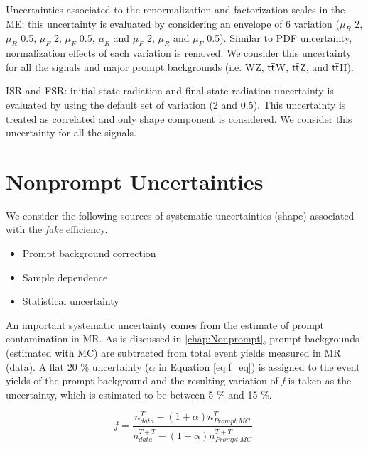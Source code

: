 Uncertainties associated to the renormalization and factorization scales in the \ac{ME}: this uncertainty is evaluated by considering an envelope of 6 variation ($\mu_R$ 2, $\mu_R$ 0.5, $\mu_F$ 2, $\mu_F$ 0.5, $\mu_R$ and $\mu_F$ 2, $\mu_R$ and $\mu_F$ 0.5). Similar to PDF uncertainty, normalization effects of each variation is removed. We consider this uncertainty for all the signals and major prompt backgrounds (i.e. WZ, $\textsf{t}\overline{\textsf{t}}$W, $\textsf{t}\overline{\textsf{t}}$Z, and $\textsf{t}\overline{\textsf{t}}$H).

ISR and FSR: initial state radiation and final state radiation uncertainty is evaluated by using the default set of variation (2 and 0.5). This uncertainty is treated as correlated and only shape component is considered. We consider this uncertainty for all the signals.

\section{Nonprompt Uncertainties}
\label{sec:NonUnc}

We consider the following sources of systematic uncertainties (shape) associated with the \emph{fake} efficiency.

\begin{itemize}
\item Prompt background correction
\item Sample dependence 
\item Statistical uncertainty 
\end{itemize}

An important systematic uncertainty comes from the estimate of prompt contamination in MR. As is discussed in \autoref{chap:Nonprompt}, prompt backgrounds (estimated with MC) are subtracted from total event yields measured in MR (data). A flat 20 $\%$ uncertainty ($\alpha$ in Equation \ref{eq:f_eq}) is assigned to the event yields of the prompt background and the resulting variation of \emph{f} is taken as the uncertainty, which is estimated to be between 5 $\%$ and 15 $\%$.

\begin{equation}
f=\frac{n_{data}^{T}-(1+\alpha)n_{Prompt~MC}^{T}}{n_{data}^{T+\overline{T}}-(1+\alpha)n_{Prompt~MC}^{T+\overline{T}}}.
\label{eq:f_eq}
\end{equation}  

